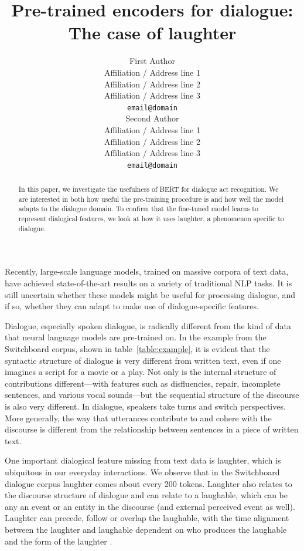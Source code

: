 \documentclass[11pt,a4paper]{article}
\title{Pre-trained encoders for dialogue: The case of laughter}
\author{First Author \\
  Affiliation / Address line 1 \\
  Affiliation / Address line 2 \\
  Affiliation / Address line 3 \\
  \texttt{email@domain} \\\And
  Second Author \\
  Affiliation / Address line 1 \\
  Affiliation / Address line 2 \\
  Affiliation / Address line 3 \\
  \texttt{email@domain} \\}
\date{}
\begin{document}
\maketitle
\begin{abstract}
  In this paper, we investigate the usefulness of BERT for dialogue act recognition.
  We are interested in both how useful the pre-training procedure is and 
  how well the model adapts to the dialogue domain.
  To confirm that the fine-tuned model learns to represent dialogical features, 
  we look at how it uses laughter, a phenomenon specific to dialogue.
\end{abstract}


Recently, large-scale language models, trained on massive corpora of text data, have achieved state-of-the-art results on a variety of traditional NLP tasks.
It is still uncertain whether these models might be useful for processing dialogue, and if so, whether they can adapt to make use of dialogue-specific features.

Dialogue, especially spoken dialogue, is radically different from the kind of data that neural language models are pre-trained on.
In the example from the Switchboard corpus, shown in table~\ref{table:example}, it is evident that the syntactic structure of dialogue is very different from  written text, even if one imagines a script for a movie or a play.
Not only is the internal structure of contributions different---with features such as disfluencies, repair, incomplete sentences, and various vocal sounds---but the sequential structure of the discourse is also very different.
In dialogue, speakers take turns and switch perspectives.
More generally, the way that utterances contribute to and cohere with the discourse is different from the relationship between sentences in a piece of written text.

One important dialogical feature missing from text data is laughter, which is ubiquitous in our everyday interactions.
We observe that in the Switchboard dialogue corpus laughter comes about every 200 tokens.
Laughter also relates to the discourse structure of dialogue and can relate to a laughable, which can be any an event or an entity in the discourse (and external perceived event as well).
Laughter can precede, follow or overlap the laughable, with the time alignment between the laughter and laughable dependent on who produces the laughable and the form of the laughter \citep{tian2016we}.
\end{document}
